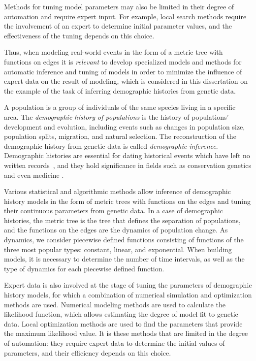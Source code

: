 Methods for tuning model parameters may also be limited in their degree of automation and require expert input.
For example, local search methods require the involvement of an expert to determine initial parameter values, and the effectiveness of the tuning depends on this choice.

Thus, when modeling real-world events in the form of a metric tree with functions on edges it is \textit{relevant} to develop specialized models and methods for automatic inference and tuning of models in order to minimize the influence of expert data on the result of modeling, which is considered in this dissertation on the example of the task of inferring demographic histories from genetic data.

A population is a group of individuals of the same species living in a specific area.
The \textit{demographic history of populations} is the history of populations' development and evolution, including events such as changes in population size, population splits, migration, and natural selection.
The reconstruction of the demographic history from genetic data is called \textit{demographic inference}.
Demographic histories are essential for dating historical events which have left no written records~\cite{goebel2008late, mellars2006going}, and they hold significance in fields such as conservation genetics \cite{nikolic2022stepping} and even medicine \cite{nielsen2007recent}.

Various statistical and algorithmic methods allow inference of demographic history models in the form of metric trees with functions on the edges and tuning their continuous parameters from genetic data.
In a case of demographic histories, the metric tree is the tree that defines the separation of populations, and the functions on the edges are the dynamics of population change.
As dynamics, we consider piecewise defined functions consisting of functions of the three most popular types: constant, linear, and exponential.
When building models, it is necessary to determine the number of time intervals, as well as the type of dynamics for each piecewise defined function.

Expert data is also involved at the stage of tuning the parameters of demographic history models, for which a combination of numerical simulation and optimization methods are used.
Numerical modeling methods are used to calculate the likelihood function, which allows estimating the degree of model fit to genetic data.
Local optimization methods are used to find the parameters that provide the maximum likelihood value.
It is these methods that are limited in the degree of automation: they require expert data to determine the initial values of parameters, and their efficiency depends on this choice.

